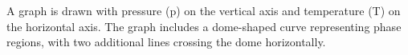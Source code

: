 A graph is drawn with pressure (p) on the vertical axis and temperature (T) on the horizontal axis. The graph includes a dome-shaped curve representing phase regions, with two additional lines crossing the dome horizontally.
